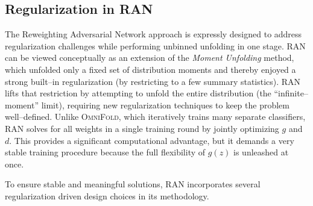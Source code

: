     \subsection{Regularization in RAN}
    \label{subsec:regularisation-in-ran}
        The Reweighting Adversarial Network approach is expressly designed to address regularization challenges while performing unbinned unfolding in one stage.
        RAN can be viewed conceptually as an extension of the \emph{Moment Unfolding} method, which unfolded only a fixed set of distribution moments and thereby enjoyed a strong built--in regularization (by restricting to a few summary statistics).
        RAN lifts that restriction by attempting to unfold the entire distribution (the “infinite--moment” limit), requiring new regularization techniques to keep the problem well--defined.\kd{}
        Unlike \textsc{OmniFold}, which iteratively trains many separate classifiers, RAN solves for all weights in a single training round by jointly optimizing $g$ and $d$.
        This provides a significant computational advantage, but it demands a very stable training procedure because the full flexibility of $g(z)$ is unleashed at once.

        To ensure stable and meaningful solutions, RAN incorporates several regularization driven design choices in its methodology.
